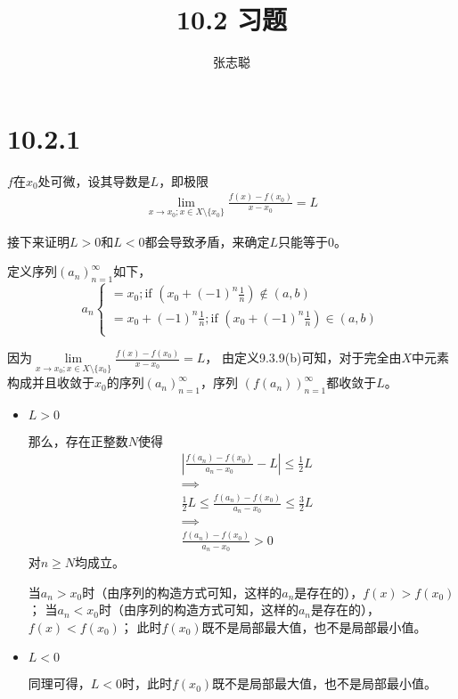 \documentclass{article}
\begin{document}
\title{10.2 习题}
\author{张志聪}
\maketitle

\section*{10.2.1}

$f$在$x_0$处可微，设其导数是$L$，即极限
\begin{align*}
  \lim\limits_{x \to x_0; x \in X \setminus \{x_0\}} \frac{f(x) - f(x_0)}{x - x_0} = L
\end{align*}

接下来证明$L > 0$和$L < 0$都会导致矛盾，来确定$L$只能等于$0$。

定义序列$(a_n)_{n=1}^\infty$如下，
\begin{equation*}
  a_n
  \begin{cases*}
    = x_0; \text{if } (x_0 + (-1)^n\frac{1}{n}) \notin (a, b)                  \\
    = x_0 + (-1)^n\frac{1}{n}; \text{if } (x_0 + (-1)^n\frac{1}{n}) \in (a, b) \\
  \end{cases*}
\end{equation*}

因为$\lim\limits_{x \to x_0; x \in X \setminus \{x_0\}} \frac{f(x) - f(x_0)}{x - x_0} = L$，
由定义9.3.9(b)可知，对于完全由$X$中元素构成并且收敛于$x_0$的序列$(a_n)_{n=1}^\infty$，序列
$(f(a_n))_{n=1}^\infty$都收敛于$L$。

\begin{itemize}
  \item $L > 0$

        那么，存在正整数$N$使得
        \begin{align*}
           & \left| \frac{f(a_n) - f(x_0)}{a_n - x_0} - L\right| \leq \frac{1}{2}L  \\
           & \implies                                                               \\
           & \frac{1}{2} L \leq \frac{f(a_n) - f(x_0)}{a_n - x_0} \leq \frac{3}{2}L \\
           & \implies                                                               \\
           & \frac{f(a_n) - f(x_0)}{a_n - x_0} > 0
        \end{align*}
        对$n \geq N$均成立。

        当$a_n > x_0$时（由序列的构造方式可知，这样的$a_n$是存在的），$f(x) > f(x_0)$；
        当$a_n < x_0$时（由序列的构造方式可知，这样的$a_n$是存在的），$f(x) < f(x_0)$；
        此时$f(x_0)$既不是局部最大值，也不是局部最小值。

  \item $L < 0$

        同理可得，$L < 0$时，此时$f(x_0)$既不是局部最大值，也不是局部最小值。

\end{itemize}
\end{document}

